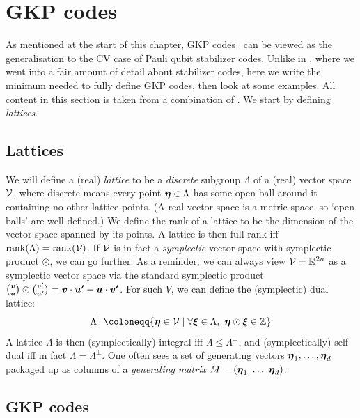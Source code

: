 \section{GKP codes}\label{sec:gkp-codes}

As mentioned at the start of this chapter, GKP codes~\cite{Gottesman_2001} can be viewed as the generalisation to the CV case of Pauli qubit stabilizer codes.
Unlike in , where we went into a fair amount of detail about stabilizer codes, here we write the minimum needed to fully define GKP codes, then look at some examples.
All content in this section is taken from a combination of .
We start by defining \textit{lattices}.

\subsection{Lattices}

We will define a (real) \textit{lattice} to be a \textit{discrete} subgroup $\Lambda$ of a (real) vector space $\mathcal{V}$, where discrete means every point $\boldsymbol{\eta} \in \Lambda$ has some open ball around it containing no other lattice points.
(A real vector space is a metric space, so `open balls' are well-defined.)
We define the rank of a lattice to be the dimension of the vector space spanned by its points.
A lattice is then full-rank iff $\operatorname{rank}(\Lambda) = \operatorname{rank}(\mathcal{V})$.
If $\mathcal{V}$ is in fact a \textit{symplectic} vector space with symplectic product $\odot$, we can go further.
As a reminder, we can always view $\mathcal{V} = \mathbb{R}^{2n}$ as a symplectic vector space via the standard symplectic product $\binom{\boldsymbol{v}}{\boldsymbol{u}} \odot \binom{\boldsymbol{v}'}{\boldsymbol{u}'} = \boldsymbol{v} \cdot \boldsymbol{u'} - \boldsymbol{u} \cdot \boldsymbol{v'}$.
For such $V$, we can define the (symplectic) dual lattice:
\begin{equation}\label{eq:sympletic_dual_lattice}
    \Lambda^{\perp} \coloneqq \{\bsym{\eta} \in \VVV \mid \forall \bsym{\xi} \in \Lambda,\ \bsym{\eta} \odot \bsym{\xi} \in \mathbb{Z}\}
\end{equation}
A lattice $\Lambda$ is then (symplectically) integral iff $\Lambda \leq \Lambda^\perp$, and (symplectically) self-dual iff in fact $\Lambda = \Lambda^\perp$.
One often sees a set of generating vectors $\boldsymbol{\eta}_1, \ldots, \boldsymbol{\eta}_d$ packaged up as columns of a \textit{generating matrix} $M = (\bsym{\eta}_1\ \ldots\ \bsym{\eta}_d)$.

\subsection{GKP codes}\label{subsec:gkp}

